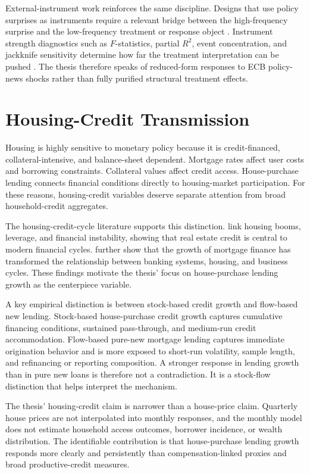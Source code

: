 External-instrument work reinforces the same discipline. Designs that use policy surprises as instruments require a relevant bridge between the high-frequency surprise and the low-frequency treatment or response object \parencite{MertensRavn2013,StockWatson2018}. Instrument strength diagnostics such as \(F\)-statistics, partial \(R^2\), event concentration, and jackknife sensitivity determine how far the treatment interpretation can be pushed \parencite{StockYogo2005}. The thesis therefore speaks of reduced-form responses to ECB policy-news shocks rather than fully purified structural treatment effects.

\section{Housing-Credit Transmission}

Housing is highly sensitive to monetary policy because it is credit-financed, collateral-intensive, and balance-sheet dependent. Mortgage rates affect user costs and borrowing constraints. Collateral values affect credit access. House-purchase lending connects financial conditions directly to housing-market participation. For these reasons, housing-credit variables deserve separate attention from broad household-credit aggregates.

The housing-credit-cycle literature supports this distinction. \textcite{JordaSchularickTaylor2015} link housing booms, leverage, and financial instability, showing that real estate credit is central to modern financial cycles. \textcite{JordaSchularickTaylor2016} further show that the growth of mortgage finance has transformed the relationship between banking systems, housing, and business cycles. These findings motivate the thesis' focus on house-purchase lending growth as the centerpiece variable.

A key empirical distinction is between stock-based credit growth and flow-based new lending. Stock-based house-purchase credit growth captures cumulative financing conditions, sustained pass-through, and medium-run credit accommodation. Flow-based pure-new mortgage lending captures immediate origination behavior and is more exposed to short-run volatility, sample length, and refinancing or reporting composition. A stronger response in lending growth than in pure new loans is therefore not a contradiction. It is a stock-flow distinction that helps interpret the mechanism.

The thesis' housing-credit claim is narrower than a house-price claim. Quarterly house prices are not interpolated into monthly responses, and the monthly model does not estimate household access outcomes, borrower incidence, or wealth distribution. The identifiable contribution is that house-purchase lending growth responds more clearly and persistently than compensation-linked proxies and broad productive-credit measures.

